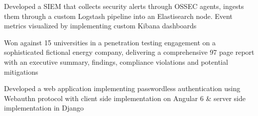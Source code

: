 \documentclass[letterpaper]{deedy-resume} %
\begin{document}
\begin{minipage}[t]{0.66\textwidth}

\sectionspace %




Developed a SIEM that collects security alerts through OSSEC agents, ingests them through a custom Logstash pipeline into an Elastisearch node. Event metrics visualized by implementing custom Kibana dashboards

\sectionspace %



Won against 15 universities in a penetration testing engagement on a sophisticated fictional energy company, delivering a comprehensive 97 page report with an executive summary, findings, compliance violations and potential mitigations

\sectionspace %


Developed a web application implementing passwordless authentication using Webauthn protocol with client side implementation on Angular 6 \& server side implementation in Django

\sectionspace %



\end{minipage}
\end{document}
